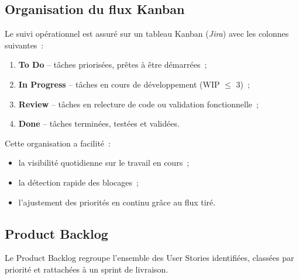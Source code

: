 \subsection{Organisation du flux Kanban}

Le suivi opérationnel est assuré sur un tableau Kanban (\textit{Jira}) avec les
colonnes suivantes~:

\begin{enumerate}
  \item \textbf{To Do} -- tâches priorisées, prêtes à être démarrées~;
  \item \textbf{In Progress} -- tâches en cours de développement (WIP $\leq$ 3)~;
  \item \textbf{Review} -- tâches en relecture de code ou validation fonctionnelle~;
  \item \textbf{Done} -- tâches terminées, testées et validées.
\end{enumerate}

Cette organisation a facilité~:
\begin{itemize}
  \item la visibilité quotidienne sur le travail en cours~;
  \item la détection rapide des blocages~;
  \item l'ajustement des priorités en continu grâce au flux tiré.
\end{itemize}

\subsection{Product Backlog}

Le Product Backlog regroupe l'ensemble des User Stories identifiées, classées
par priorité et rattachées à un sprint de livraison.

